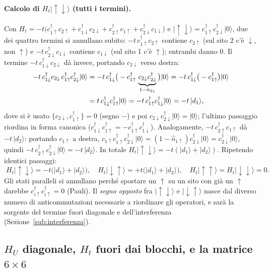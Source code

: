 \documentclass[11pt,a4paper]{article}
\newcommand{\ket}[1]{\lvert #1 \rangle}
\newcommand{\up}{\uparrow}
\newcommand{\dn}{\downarrow}
\newcommand{\dg}{\dagger}
\newcommand{\opn}{\hat{n}}
\theoremstyle{definition}
\theoremstyle{remark}
\begin{document}
\paragraph{Calcolo di $H_t\ket{\up\dn}$ (tutti i termini).} Con $H_t=-t\big(c_{1\up}^{\dg}c_{2\up}
+c_{1\dn}^{\dg}c_{2\dn}+c_{2\up}^{\dg}c_{1\up}+c_{2\dn}^{\dg}c_{1\dn}\big)$ e
$\ket{\up\dn}=c_{1\up}^{\dg}c_{2\dn}^{\dg}\ket{0}$, due dei quattro termini si annullano subito:
$-t\,c_{1\up}^{\dg}c_{2\up}$ contiene $c_{2\up}$ (sul sito 2 c'è $\dn$, non $\up$) e
$-t\,c_{2\dn}^{\dg}c_{1\dn}$ contiene $c_{1\dn}$ (sul sito 1 c'è $\up$); entrambi danno $0$. Il termine
$-t\,c_{1\dn}^{\dg}c_{2\dn}$ dà invece, portando $c_{2\dn}$ verso destra:
\begin{align}
-t\,c_{1\dn}^{\dg}c_{2\dn}\,c_{1\up}^{\dg}c_{2\dn}^{\dg}\ket{0}
&=-t\,c_{1\dn}^{\dg}\big(-c_{1\up}^{\dg}\,\underbrace{c_{2\dn}c_{2\dn}^{\dg}}_{1-\opn_{2\dn}}\big)\ket{0}
=-t\,c_{1\dn}^{\dg}\big(-c_{1\up}^{\dg}\big)\ket{0}\notag\\
&= t\,c_{1\dn}^{\dg}c_{1\up}^{\dg}\ket{0}
= -t\,c_{1\up}^{\dg}c_{1\dn}^{\dg}\ket{0} = -t\,\ket{d_1},
\end{align}
dove si è usato $\{c_{2\dn},c_{1\up}^{\dg}\}=0$ (segno $-$) e poi $c_{2\dn}c_{2\dn}^{\dg}\ket{0}=\ket{0}$;
l'ultimo passaggio riordina in forma canonica ($c_{1\dn}^{\dg}c_{1\up}^{\dg}=-c_{1\up}^{\dg}c_{1\dn}^{\dg}$).
Analogamente, $-t\,c_{2\up}^{\dg}c_{1\up}$ dà $-t\,\ket{d_2}$: portando $c_{1\up}$ a destra,
$c_{1\up}c_{1\up}^{\dg}c_{2\dn}^{\dg}\ket{0}=(1-\opn_{1\up})c_{2\dn}^{\dg}\ket{0}=c_{2\dn}^{\dg}\ket{0}$,
quindi $-t\,c_{2\up}^{\dg}c_{2\dn}^{\dg}\ket{0}=-t\,\ket{d_2}$.
In totale $H_t\ket{\up\dn}=-t(\ket{d_1}+\ket{d_2})$. Ripetendo identici passaggi:
\begin{equation}
\boxed{\;H_t\ket{\up\dn}=-t\big(\ket{d_1}+\ket{d_2}\big),\quad
H_t\ket{\dn\up}=+t\big(\ket{d_1}+\ket{d_2}\big),\quad
H_t\ket{\up\up}=H_t\ket{\dn\dn}=0.\;}
\label{eq:Htaction}
\end{equation}
Gli stati paralleli si annullano perché spostare un $\up$ su un sito con già un $\up$ darebbe
$c_{i\up}^{\dg}c_{i\up}^{\dg}=0$ (Pauli). Il \emph{segno opposto} fra $\ket{\up\dn}$ e $\ket{\dn\up}$
nasce dal diverso numero di anticommutazioni necessarie a riordinare gli operatori, e sarà la sorgente
del termine fuori diagonale e dell'interferenza (Sezione~\ref{sub:interferenza}).

\subsection{$H_U$ diagonale, $H_t$ fuori dai blocchi, e la matrice $6\times6$}
\label{sub:blocchi}
\end{document}
